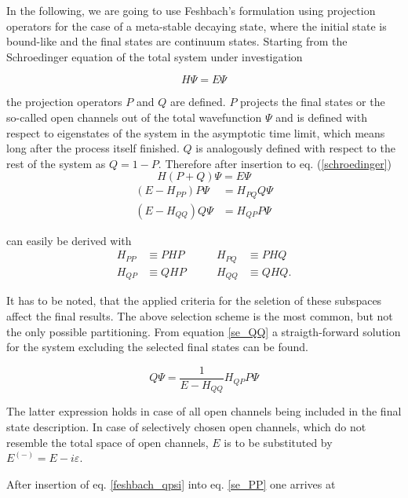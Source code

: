 In the following, we are going to use Feshbach's formulation using projection
operators for the case of a meta-stable decaying state, where the initial state
is bound-like and the final states are continuum states.
Starting from the Schroedinger equation of the total system under investigation

\begin{equation}
  H \Psi = E \Psi \label{schroedinger}
\end{equation}

the projection operators $P$ and $Q$ are defined. $P$ projects the final states
or the so-called open channels out
of the total wavefunction $\Psi$ and is defined with respect to eigenstates
of the system in the asymptotic time limit, which means long after the process
itself finished. $Q$ is analogously defined with respect to the rest of the
system as $Q = 1 - P$. Therefore after insertion to eq. (\ref{schroedinger})
\begin{equation}
  H (P+Q) \Psi = E \Psi
\end{equation}
\begin{align}
  (E - H_{PP}) P \Psi & = H_{PQ} Q \Psi \label{se_PP}\\
  (E - H_{QQ}) Q \Psi & = H_{QP} P \Psi \label{se_QQ}
\end{align}

can easily be derived with
\begin{align*}
  H_{PP} & \equiv PHP & \quad\quad H_{PQ} & \equiv PHQ\\
  H_{QP} & \equiv QHP & \quad\quad H_{QQ} & \equiv QHQ .
\end{align*}

It has to be noted, that the applied criteria for the seletion of
these subspaces affect the final results. The above selection scheme is the
most common, but not the only possible partitioning.
From equation \ref{se_QQ} a straigth-forward solution for the system excluding
the selected final states can be found.

\begin{equation}
  Q \Psi = \frac{1}{E-H_{QQ}} H_{QP} P \Psi \label{feshbach_qpsi}
\end{equation}

The latter expression holds in case of all open channels being included
in the final state description.
In case of selectively chosen open channels, which do not resemble the total
space of open channels,
$E$ is to be substituted by $E^{(-)}=E - i\varepsilon$.

After insertion of eq. \ref{feshbach_qpsi} into eq. \ref{se_PP} one arrives at

